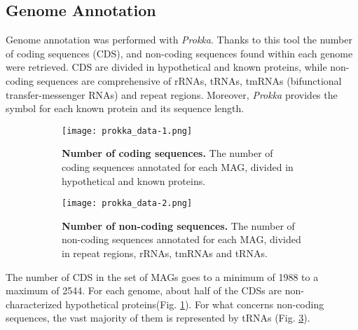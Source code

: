 \subsection*{Genome Annotation}
\graphicspath{{../Rscript/CMG_Rscript_files/figure-gfm/}}


Genome annotation was performed with \textit{Prokka}. Thanks to this tool the number of coding sequences (CDS), and non-coding sequences found within each genome were retrieved. CDS are divided in hypothetical and known proteins, while non-coding sequences are comprehensive of rRNAs, tRNAs, tmRNAs (bifunctional transfer-messenger RNAs) and repeat regions. Moreover, \textit{Prokka} provides the symbol for each known protein and its sequence length.

\begin{figure}[!h]
\centering
\begin{subfigure}{0.49\textwidth}
    \centering
    \texttt{[image: prokka\_data-1.png]}
    \caption{\footnotesize{\textbf{Number of coding sequences.} The number of coding sequences annotated for each MAG, divided in hypothetical and known proteins.}}
    \label{fig:prokka1}
\end{subfigure}
\begin{subfigure}{0.49\textwidth}
    \centering
    \texttt{[image: prokka\_data-2.png]}
    \caption{\footnotesize{\textbf{Number of non-coding sequences.} The number of non-coding sequences annotated for each MAG, divided in repeat regions, rRNAs, tmRNAs and tRNAs.}}
    \label{fig:prokka2}
\end{subfigure}
\caption{}
\end{figure}

The number of CDS in the set of MAGs goes to a minimum of 1988 to a maximum of 2544. For each genome, about half of the CDSs are non-characterized hypothetical proteins(Fig. \ref{fig:prokka1}). For what concerns non-coding sequences, the vast majority of them is represented by tRNAs (Fig. \ref{fig:prokka2}).
